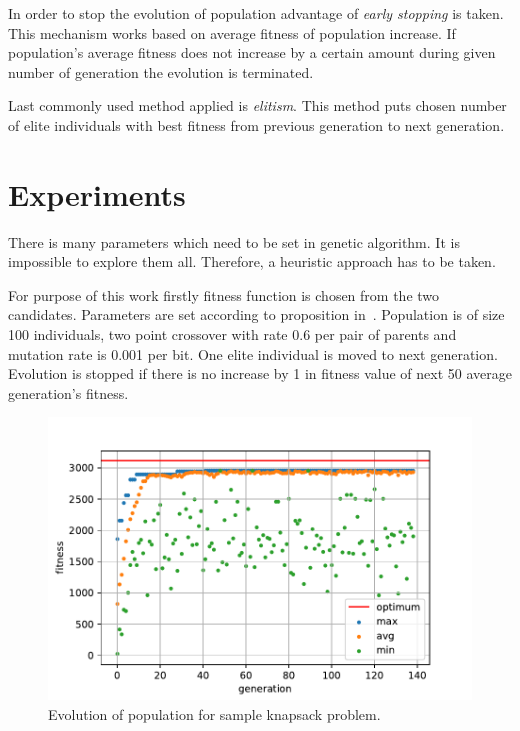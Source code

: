 \documentclass{article}
\begin{document}
In order to stop the evolution of population advantage of
\textit{early stopping} is taken.
This mechanism works based on average fitness of population increase.
If population's average fitness does not increase by a certain amount
during given number of generation the evolution is terminated.

Last commonly used method applied is \textit{elitism}.
This method puts chosen number of elite individuals with best fitness
from previous generation to next generation.

\section{Experiments}

There is many parameters which need to be set in genetic algorithm.
It is impossible to explore them all.
Therefore, a heuristic approach has to be taken.

For purpose of this work firstly fitness function is chosen
from the two candidates.
Parameters are set according to proposition in~\cite{dejong1975}.
Population is of size 100 individuals,
two point crossover with rate 0.6 per pair of parents
and mutation rate is 0.001 per bit.
One elite individual is moved to next generation.
Evolution is stopped if there is no increase by 1 in fitness
value of next 50 average generation's fitness.

\begin{figure}[ht]
\vskip 0.2in
\begin{center}
\centerline{\includegraphics[width=\columnwidth]{evolution}}
\caption{Evolution of population for sample knapsack problem.}
\label{evolution}
\end{center}
\vskip -0.2in
\end{figure}
\end{document}
